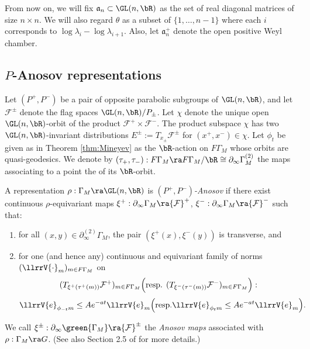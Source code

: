 From now on, we will fix $\mathfrak{a}_n \subset \GL(n, \bR)$ 
as the set of real diagonal matrices of size $n \times n$. 
We will also regard $\theta$ as a subset of $\{1, \dots, n-1\}$ where 
each $i$ corresponds to $\log \lambda_i - \log \lambda_{i+1}$. 
Also, let $\mathfrak{a}_n^+ $ denote the open positive Weyl chamber. 


\subsection{$P$-Anosov representations}  \label{sub:Panosov} 
Let $(P^{+}, P^{-})$ be a pair of opposite parabolic subgroups of $\GL(n, \bR)$, and 
let $\mathcal{F}^{{\pm}}$ denote the flag spaces $\GL(n, \bR)/P_{\pm}$.
Let $\chi$ denote the unique open $\GL(n, \bR)$-orbit of the product 
$\mathcal{F}^{+}\times \mathcal{F}^{-}$. 
The product subspace $\chi$ has two $\GL(n, \bR)$-invariant 
distributions $E^{\pm} := T_{x_{\pm}} \mathcal{F}^{\pm}$ for $(x^{+}, x^{-}) \in \chi$. 
Let $\phi_t$ be given as in Theorem \ref{thm:Mineyev} as the $\bR$-action on 
$F \Gamma_M$  whose orbits are quasi-geodesics. 
We denote by $(\tau_+, \tau_-): F\Gamma_M \ra F\Gamma_M/\bR \cong \partial_\infty \Gamma_M^{(2)}$ the maps associating to a point the  of its $\bR$-orbit.


\begin{definition}\label{defn:Anosov} 
	A representation $\rho: \Gamma_M \ra \GL(n, \bR)$ is {\em $(P^{+}, P^{-})$-Anosov} if 
	there exist continuous $\rho$-equivariant maps $\xi^+: \partial_\infty \Gamma_M \ra {\mathcal{F}}^+$, 
	$\xi^-:\partial_\infty \Gamma_M \ra {\mathcal{F}}^-$ such that:  
	\begin{enumerate} 
		\item[(i)] for all $(x, y)\in \partial_\infty^{(2)} \Gamma_M$, the pair 
		$(\xi^+(x), \xi^-(y))$ is transverse, and  
		\item[(ii)] for one (and hence any) continuous and equivariant family of norms 
		$(\llrrV{\cdot}_{m})_{m\in F\Gamma_M} $ on 
		\[(T_{\xi^+(\tau^+(m))} {\mathcal{F}}^+)_{m\in F\Gamma_M}
		\Big(\hbox{resp. } 
		(T_{\xi^-(\tau^-(m))} {\mathcal{F}}^-)_{m\in F\Gamma_M}\Big):\]
		\[ \llrrV{e}_{\phi_{-t}m} \leq A e^{-at} \llrrV{e}_{m}  \Big(\hbox{resp.} 
		\llrrV{e}_{\phi_{t}m} \leq A e^{-at} \llrrV{e}_{m} \Big).
		   \]
	\end{enumerate}
We call 	$\xi^\pm:\partial_\infty \green{\Gamma_M} \ra {\mathcal{F}}^\pm$ the {\em Anosov maps} associated with 
$\rho: \Gamma_M \ra G$. 
	(See also Section 2.5 of  \cite{GGKW17ii} for more details.)
\end{definition} 



